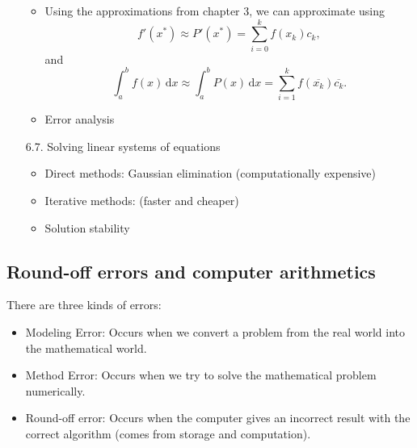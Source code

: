 \documentclass[class=article, crop=false]{standalone}
\begin{document}
\begin{enumerate}
\begin{itemize}
      \item Using the approximations from chapter $3$, we can approximate using
      \[
        f'(x^*)\approx P'(x^*) = \sum_{i=0}^{k}f(x_k)c_k,
      \]
      and
      \[
        \int_{a}^{b}f(x) \,\mathrm dx\approx \int_{a}^{b}P(x) \,\mathrm dx = \sum_{i=1}^{k} f(\overline{x_k})\overline{c_k}.
      \]
      \item Error analysis
    \end{itemize}
    \item[6.7.] Solving linear systems of equations
    \begin{itemize}
      \item Direct methods: Gaussian elimination (computationally expensive)
      \item Iterative methods: (faster and cheaper)
      \item Solution stability
    \end{itemize}
  \end{enumerate}
  \subsection{Round-off errors and computer arithmetics}
  There are three kinds of errors:
  \begin{itemize}
    \item Modeling Error: Occurs when we convert a problem from the real world into the mathematical world.
    \item Method Error: Occurs when we try to solve the mathematical problem numerically.
    \item Round-off error: Occurs when the computer gives an incorrect result with the correct algorithm (comes from storage and computation).
  \end{itemize}
\end{document}
